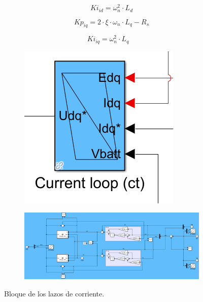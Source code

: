 \begin{equation}
Ki_{id} = \omega_n^2 \cdot L_d
\end{equation}

\begin{equation}
Kp_{iq} = 2 \cdot \xi \cdot \omega_n \cdot L_q - R_s
\end{equation}

\begin{equation}
Ki_{iq} = \omega_n^2 \cdot L_q \quad
\end{equation}

\begin{figure}[H]
    \begin{subfigure}{0.2\linewidth}
        \centering
        \includegraphics[width=\linewidth]{fig/PIEMR_out.png}
    \end{subfigure}
    \begin{subfigure}{0.75\linewidth}
        \centering
        \includegraphics[width=\linewidth]{fig/PIEMR_in.png}
    \end{subfigure}
    \caption{Bloque de los lazos de corriente.}
\end{figure}

